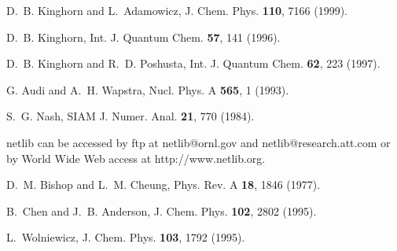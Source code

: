 \documentclass[12pt]{article}
\begin{document}
\begin{thebibliography}{10}

D.~B. Kinghorn and L.~Adamowicz,
\newblock J. Chem. Phys. {\bf 110}, 7166 (1999).

D.~B. Kinghorn,
\newblock Int. J. Quantum Chem. {\bf 57}, 141 (1996).

D.~B. Kinghorn and R.~D. Poshusta,
\newblock Int. J. Quantum Chem. {\bf 62}, 223 (1997).

G. Audi and A.~H. Wapstra, Nucl. Phys. A {\bf 565},  1  (1993).

S.~G. Nash,
\newblock SIAM J. Numer. Anal. {\bf 21}, 770 (1984).

netlib can be accessed by ftp at netlib@ornl.gov and 
netlib@research.att.com or by World Wide Web access at http://www.netlib.org.

D.~M. Bishop and L.~M. Cheung,
\newblock Phys. Rev. A {\bf 18}, 1846 (1977).

B.~Chen and J.~B. Anderson,
\newblock J. Chem. Phys. {\bf 102}, 2802 (1995).

L.~Wolniewicz,
\newblock J. Chem. Phys. {\bf 103}, 1792 (1995).

\end{thebibliography}
\end{document}
